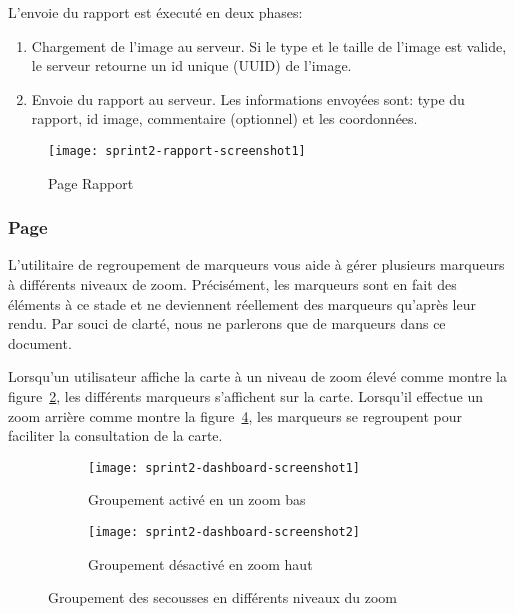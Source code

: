 L'envoie du rapport est éxecuté en deux phases:

\begin{enumerate}
    \item Chargement de l'image au serveur. Si le type et le taille de l'image
        est valide, le serveur retourne un id unique (UUID) de l'image.
    \item Envoie du rapport au serveur. Les informations envoyées sont: type du
        rapport, id image, commentaire (optionnel) et les coordonnées.
\end{enumerate}

\begin{figure}[htbp]
    \centering
    \texttt{[image: sprint2-rapport-screenshot1]}
    \caption{Page Rapport}
\label{fig:sprint2-rapport-screenshot1}
\end{figure}

\subsubsection{Page }

L'utilitaire de regroupement de marqueurs vous aide à gérer plusieurs marqueurs
à différents niveaux de zoom. Précisément, les marqueurs sont en fait des
éléments à ce stade et ne deviennent réellement des marqueurs qu'après leur
rendu. Par souci de clarté, nous ne parlerons que de marqueurs dans ce
document.

Lorsqu'un utilisateur affiche la carte à un niveau de zoom élevé comme montre
la figure~\ref{fig:sprint2-dashboard-screenshot1}, les différents marqueurs
s'affichent sur la carte. Lorsqu'il effectue un zoom arrière comme montre la
figure~\ref{fig:sprint2-dashboard-screenshot2}, les marqueurs se regroupent
pour faciliter la consultation de la carte.

\begin{figure}[htbp]
    \begin{subfigure}{.5\textwidth}
        \centering
        \texttt{[image: sprint2-dashboard-screenshot1]}
        \caption{Groupement activé en un zoom bas}
\label{fig:sprint2-dashboard-screenshot1}
    \end{subfigure}
    \begin{subfigure}{.5\textwidth}
        \centering
        \texttt{[image: sprint2-dashboard-screenshot2]}
        \caption{Groupement désactivé en zoom haut}
\label{fig:sprint2-dashboard-screenshot2}
    \end{subfigure}
    \caption{Groupement des secousses en différents niveaux du zoom}
\end{figure}

